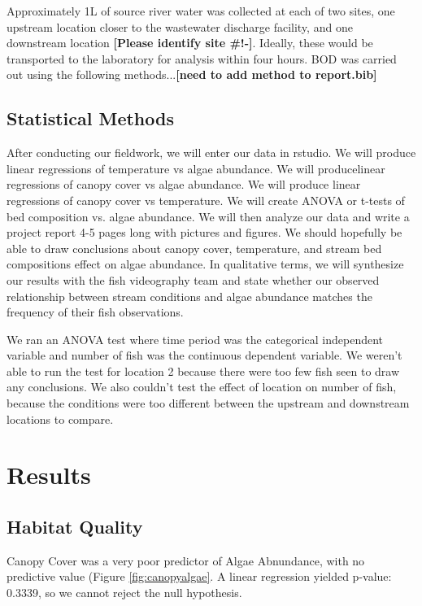 \documentclass{article}\usepackage[]{graphicx}\usepackage[]{color}
\begin{document}
Approximately 1L of source river water was collected at each of two sites, one upstream location closer to the wastewater discharge facility, and one downstream location \textbf{[Please identify site \#!-]}. Ideally, these would be transported to the laboratory for analysis within four hours. BOD was carried out using the following methods...\textbf{[need to add method to report.bib]}

\subsection{Statistical Methods}

After conducting our ﬁeldwork, we will enter our data in rstudio. We will produce linear regressions of temperature vs algae abundance. We will producelinear regressions of canopy cover vs algae abundance. We will produce linear regressions of canopy cover vs temperature. We will create ANOVA or t-tests of bed composition vs. algae abundance. We will then analyze our data and write a project report 4-5 pages long with pictures and ﬁgures. We should hopefully be able to draw conclusions about canopy cover, temperature, and stream bed compositions eﬀect on algae abundance. In qualitative terms, we will synthesize our results with the ﬁsh videography team and state whether our observed relationship between stream conditions and algae abundance matches the frequency of their ﬁsh observations.


We ran an ANOVA test where time period was the categorical independent variable and number of fish was the continuous dependent variable.  We weren't able to run the test for location 2 because there were too few fish seen to draw any conclusions.  We also couldn't test the effect of location on number of fish, because the conditions were too different between the upstream and downstream locations to compare.

\section{Results}



\subsection{Habitat Quality}

Canopy Cover was a very poor predictor of Algae Abnundance, with no predictive value (Figure \ref{fig:canopyalgae}. A linear regression yielded p-value: 0.3339, so we cannot reject the null hypothesis.
\end{document}
